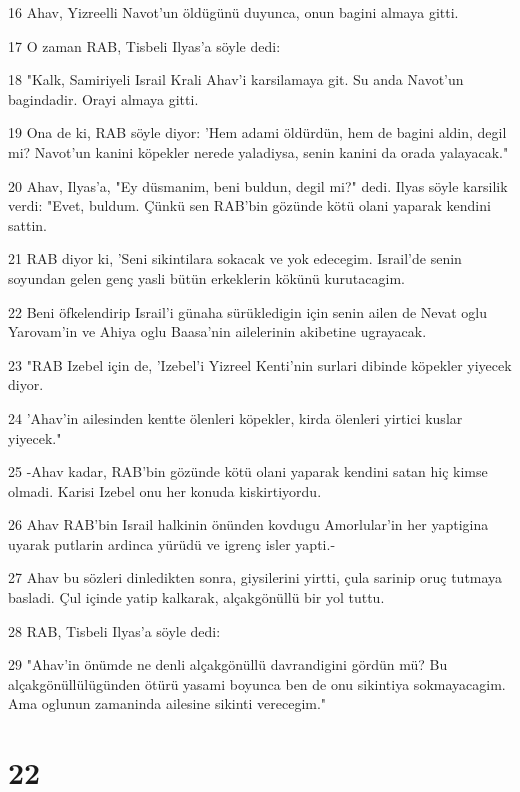\par 16 Ahav, Yizreelli Navot'un öldügünü duyunca, onun bagini almaya gitti.
\par 17 O zaman RAB, Tisbeli Ilyas'a söyle dedi:
\par 18 "Kalk, Samiriyeli Israil Krali Ahav'i karsilamaya git. Su anda Navot'un bagindadir. Orayi almaya gitti.
\par 19 Ona de ki, RAB söyle diyor: 'Hem adami öldürdün, hem de bagini aldin, degil mi? Navot'un kanini köpekler nerede yaladiysa, senin kanini da orada yalayacak."
\par 20 Ahav, Ilyas'a, "Ey düsmanim, beni buldun, degil mi?" dedi. Ilyas söyle karsilik verdi: "Evet, buldum. Çünkü sen RAB'bin gözünde kötü olani yaparak kendini sattin.
\par 21 RAB diyor ki, 'Seni sikintilara sokacak ve yok edecegim. Israil'de senin soyundan gelen genç yasli bütün erkeklerin kökünü kurutacagim.
\par 22 Beni öfkelendirip Israil'i günaha sürükledigin için senin ailen de Nevat oglu Yarovam'in ve Ahiya oglu Baasa'nin ailelerinin akibetine ugrayacak.
\par 23 "RAB Izebel için de, 'Izebel'i Yizreel Kenti'nin surlari dibinde köpekler yiyecek diyor.
\par 24 'Ahav'in ailesinden kentte ölenleri köpekler, kirda ölenleri yirtici kuslar yiyecek."
\par 25 -Ahav kadar, RAB'bin gözünde kötü olani yaparak kendini satan hiç kimse olmadi. Karisi Izebel onu her konuda kiskirtiyordu.
\par 26 Ahav RAB'bin Israil halkinin önünden kovdugu Amorlular'in her yaptigina uyarak putlarin ardinca yürüdü ve igrenç isler yapti.-
\par 27 Ahav bu sözleri dinledikten sonra, giysilerini yirtti, çula sarinip oruç tutmaya basladi. Çul içinde yatip kalkarak, alçakgönüllü bir yol tuttu.
\par 28 RAB, Tisbeli Ilyas'a söyle dedi:
\par 29 "Ahav'in önümde ne denli alçakgönüllü davrandigini gördün mü? Bu alçakgönüllülügünden ötürü yasami boyunca ben de onu sikintiya sokmayacagim. Ama oglunun zamaninda ailesine sikinti verecegim."

\chapter{22}


